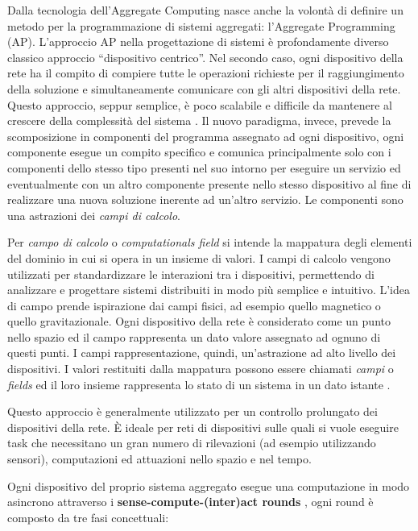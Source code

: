 \documentclass[12pt,a4paper,openright,twoside]{book}
\begin{document}
Dalla tecnologia dell'Aggregate Computing nasce anche la volontà di definire un metodo per la programmazione di sistemi aggregati: l'Aggregate Programming (AP). 
L'approccio \ac{AP} nella progettazione di sistemi è profondamente diverso classico approccio ``dispositivo centrico''.
Nel secondo caso, ogni dispositivo della rete ha il compito di compiere tutte le operazioni richieste per il raggiungimento della soluzione e simultaneamente comunicare con gli altri dispositivi della rete. Questo approccio, seppur semplice, è poco scalabile e difficile da mantenere al crescere della complessità del sistema \cite{Pianini2017}. 
Il nuovo paradigma, invece, prevede la scomposizione in componenti del programma assegnato ad ogni dispositivo, ogni componente esegue un compito specifico e comunica principalmente solo con i componenti dello stesso tipo presenti nel suo intorno per eseguire un servizio ed eventualmente con un altro componente presente nello stesso dispositivo al fine di realizzare una nuova soluzione inerente ad un'altro servizio. Le componenti sono una astrazioni dei \textit{campi di calcolo}.

Per \textit{campo di calcolo} o \textit{computationals field} si intende la mappatura degli elementi del dominio in cui si opera in un insieme di valori.
I campi di calcolo vengono utilizzati per standardizzare le interazioni tra i dispositivi, permettendo di analizzare e progettare sistemi distribuiti in modo più semplice e intuitivo. L'idea di campo prende ispirazione dai campi fisici, ad esempio quello magnetico o quello gravitazionale. Ogni dispositivo della rete è considerato come un punto nello spazio ed il campo rappresenta un dato valore assegnato ad ognuno di questi punti. I campi rappresentazione, quindi, un'astrazione ad alto livello dei dispositivi. I valori restituiti dalla mappatura possono essere chiamati \textit{campi} o \textit{fields} ed il loro insieme rappresenta lo stato di un sistema in un dato istante \cite{Audrito2019}.

Questo approccio è generalmente utilizzato per un controllo prolungato dei dispositivi della rete. È ideale per reti di dispositivi sulle quali si vuole eseguire task che necessitano un gran numero di rilevazioni (ad esempio utilizzando sensori), computazioni ed attuazioni nello spazio e nel tempo.

Ogni dispositivo del proprio sistema aggregato esegue una computazione in modo asincrono attraverso i \textbf{sense-compute-(inter)act rounds}\label{sec:sense-compute-interact} \cite{Macroswarm}, ogni round è composto da tre fasi concettuali:
\end{document}
